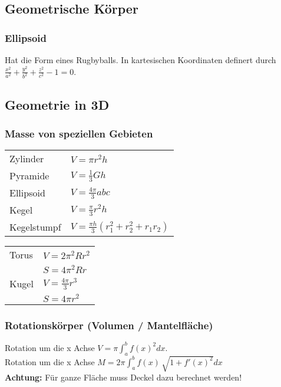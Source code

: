\subsection{Geometrische Körper}
\subsubsection{Ellipsoid}
Hat die Form eines Rugbyballs. In kartesischen Koordinaten definert durch
$\frac{x^2}{a^2} + \frac{y^2}{b^2} + \frac{z^2}{c^2} - 1 = 0$.

\subsection{Geometrie in 3D}
\subsubsection*{Masse von speziellen Gebieten}
	\begin{multicols}{2}
	\renewcommand\arraystretch{1.4}
	\begin{tabular}{l|l}
		Zylinder   &   $ V = \pi r^2 h $ \\
		Pyramide   &   $ V = \frac{1}{3} G h $ \\
		Ellipsoid   &   $ V = \frac{4 \pi}{3} a b c $ \\
		Kegel   &   $ V = \frac{\pi}{3} r^2 h $ \\
		Kegelstumpf   &   $ V = \frac{\pi h}{3} (r_1^2+r_2^2 + r_1 r_2) $ 
	\end{tabular}
	
	\columnbreak
	\begin{tabular}{l|l}
		Torus   &   $ V = 2 \pi^2 R r^2 $ \\
		   &   $ S = 4 \pi^2 R r $ \\
		Kugel   &   $ V = \frac{4 \pi}{3} r^3 $ \\
		   &   $ S = 4 \pi r^2 $ 
	\end{tabular}
	\end{multicols}

\subsubsection*{Rotationskörper (Volumen / Mantelfläche)}
Rotation um die x Achse $V =\pi \int_a^b f(x)^2 dx.$\\
Rotation um die x Achse $M = 2\pi \int_a^b f(x) \, \sqrt{1 + f'(x)^2} dx$\\
{\small \textbf{Achtung:} Für ganze Fläche muss Deckel dazu berechnet werden!}

